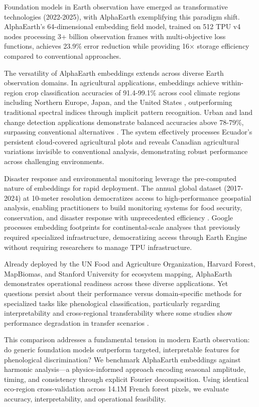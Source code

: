 \documentclass[utf8]{FrontiersinHarvard}
\begin{document}
Foundation models in Earth observation have emerged as transformative technologies (2022-2025), with AlphaEarth \citep{AlphaEarth2025} exemplifying this paradigm shift. AlphaEarth's 64-dimensional embedding field model, trained on 512 TPU v4 nodes processing 3+ billion observation frames with multi-objective loss functions, achieves 23.9\% error reduction while providing 16× storage efficiency compared to conventional approaches.

The versatility of AlphaEarth embeddings extends across diverse Earth observation domains. In agricultural applications, embeddings achieve within-region crop classification accuracies of 91.4-99.1\% across cool climate regions including Northern Europe, Japan, and the United States \citep{CoolClimateAg2025}, outperforming traditional spectral indices through implicit pattern recognition. Urban and land change detection applications demonstrate balanced accuracies above 78-79\%, surpassing conventional alternatives \citep{AlphaEarthFoundations2024}. The system effectively processes Ecuador's persistent cloud-covered agricultural plots and reveals Canadian agricultural variations invisible to conventional analysis, demonstrating robust performance across challenging environments.

Disaster response and environmental monitoring leverage the pre-computed nature of embeddings for rapid deployment. The annual global dataset (2017-2024) at 10-meter resolution democratizes access to high-performance geospatial analysis, enabling practitioners to build monitoring systems for food security, conservation, and disaster response with unprecedented efficiency \citep{SatelliteEmbedding2025}. Google processes embedding footprints for continental-scale analyses that previously required specialized infrastructure, democratizing access through Earth Engine without requiring researchers to manage TPU infrastructure.

Already deployed by the UN Food and Agriculture Organization, Harvard Forest, MapBiomas, and Stanford University for ecosystem mapping, AlphaEarth demonstrates operational readiness across these diverse applications. Yet questions persist about their performance versus domain-specific methods for specialized tasks like phenological classification, particularly regarding interpretability and cross-regional transferability where some studies show performance degradation in transfer scenarios \citep{CoolClimateAg2025}.

This comparison addresses a fundamental tension in modern Earth observation: do generic foundation models outperform targeted, interpretable features for phenological discrimination? We benchmark AlphaEarth embeddings against harmonic analysis—a physics-informed approach encoding seasonal amplitude, timing, and consistency through explicit Fourier decomposition. Using identical eco-region cross-validation across 14.1M French forest pixels, we evaluate accuracy, interpretability, and operational feasibility.
\end{document}

